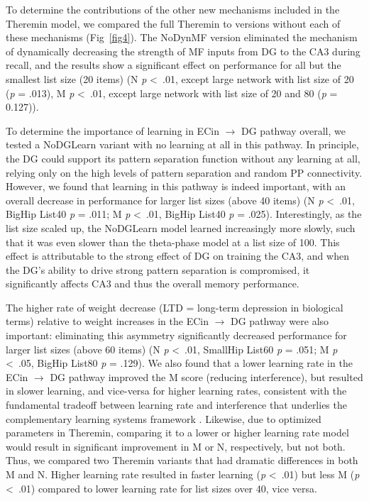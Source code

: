 \documentclass[10pt,letterpaper]{article}
\begin{document}
To determine the contributions of the other new mechanisms included in the Theremin model, we compared the full Theremin to versions without each of these mechanisms (Fig~\ref{fig4}).  The NoDynMF version eliminated the mechanism of dynamically decreasing the strength of MF inputs from DG to the CA3 during recall, and the results show a significant effect on performance for all but the smallest list size (20 items) (N \emph{p} \textless \ .01, except large network with list size of 20 (\emph{p} = .013), M \emph{p} \textless \ .01, except large network with list size of 20 and 80 (\emph{p} = 0.127)). 

To determine the importance of learning in ECin $\rightarrow$ DG pathway overall, we tested a NoDGLearn variant with no learning at all in this pathway.  In principle, the DG could support its pattern separation function without any learning at all, relying only on the high levels of pattern separation and random PP connectivity.  However, we found that learning in this pathway is indeed important, with an overall decrease in performance for larger list sizes (above 40 items) (N \emph{p} \textless \ .01, BigHip List40 \emph{p} = .011; M \emph{p} \textless \ .01, BigHip List40 \emph{p} = .025).  Interestingly, as the list size scaled up, the NoDGLearn model learned increasingly more slowly, such that it was even slower than the theta-phase model at a list size of 100. This effect is attributable to the strong effect of DG on training the CA3, and when the DG's ability to drive strong pattern separation is compromised, it significantly affects CA3 and thus the overall memory performance.

The higher rate of weight decrease (LTD = long-term depression in biological terms) relative to weight increases in the ECin $\rightarrow$ DG pathway were also important: eliminating this asymmetry significantly decreased performance for larger list sizes (above 60 items) (N \emph{p} \textless \ .01, SmallHip List60 \emph{p} = .051; M \emph{p} \textless \ .05, BigHip List80 \emph{p} = .129).  We also found that a lower learning rate in the ECin $\rightarrow$ DG pathway improved the M score (reducing interference), but resulted in slower learning, and vice-versa for higher learning rates, consistent with the fundamental tradeoff between learning rate and interference that underlies the complementary learning systems framework \cite{McClellandMcNaughtonOReilly95}.  Likewise, due to optimized parameters in Theremin, comparing it to a lower or higher learning rate model would result in significant improvement in M or N, respectively, but not both. Thus, we compared two Theremin variants that had dramatic differences in both M and N. Higher learning rate resulted in faster learning (\emph{p} \textless \ .01) but less M (\emph{p} \textless \ .01) compared to lower learning rate for list sizes over 40, vice versa.
\end{document}
